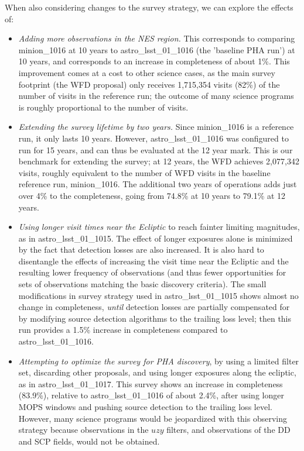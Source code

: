 When also considering changes to the survey strategy, we can explore the effects of:
\begin{itemize}
\item {\it Adding more observations in the NES region.} This corresponds to comparing minion\_1016 at 10 years to astro\_lsst\_01\_1016 (the 'baseline PHA run') at 10 years, and corresponds to an increase in completeness of about 1\%. This improvement comes at a cost to other science cases, as the main survey footprint (the WFD proposal) only receives 1,715,354 visits (82\%) of the number of visits in the reference run; the outcome of many science programs is roughly proportional to the number of visits. 
\item  {\it Extending the survey lifetime by two years.} Since minion\_1016 is a reference run, it only lasts 10 years. However, astro\_lsst\_01\_1016 was configured to run for 15 years, and can thus be evaluated at the 12 year mark. This is our benchmark for extending the survey; at 12 years, the WFD achieves 2,077,342 visits, roughly equivalent to the number of WFD visits in the baseline reference run, minion\_1016.  The additional two years of operations adds just over 4\% to the completeness, going from 74.8\% at 10 years to 79.1\% at 12 years. 
\item  {\it Using longer visit times near the Ecliptic} to reach fainter limiting magnitudes, as in astro\_lsst\_01\_1015. The effect of longer exposures alone is minimized by the fact that detection losses are also increased. It is also hard to disentangle the effects of increasing the visit time near the Ecliptic and the resulting lower frequency of observations (and thus fewer opportunities for sets of observations matching the basic discovery criteria). The small modifications in survey strategy used in astro\_lsst\_01\_1015 shows almost no change in completeness, {\it until} detection losses are partially compensated for by modifying source detection algorithms to the trailing loss level; then this run provides a 1.5\% increase in completeness compared to astro\_lsst\_01\_1016. 
\item  {\it Attempting to optimize the survey for PHA discovery}, by using a limited filter set, discarding other proposals, and using longer exposures along the ecliptic, as in astro\_lsst\_01\_1017. This survey shows an increase in completeness (83.9\%), relative to astro\_lsst\_01\_1016 of about 2.4\%, after using longer MOPS windows and pushing source detection to the trailing loss level.
However, many science programs would be jeopardized with this observing strategy because observations in the $uzy$ filters,
and observations of the DD and SCP fields, would not be obtained. 
\end{itemize}

